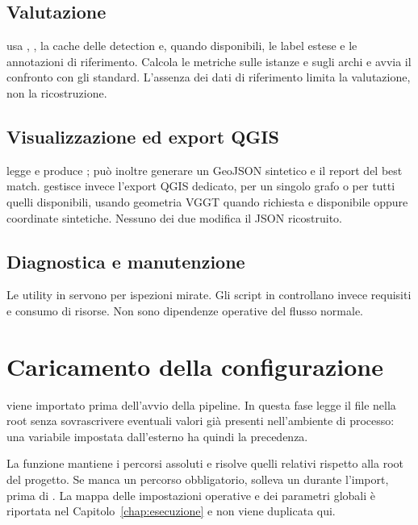 \subsection{Valutazione}

 usa ,
, la cache delle detection e, quando disponibili,
le label estese e le annotazioni di riferimento. Calcola le metriche sulle
istanze e sugli archi e avvia il confronto con gli standard. L'assenza dei dati
di riferimento limita la valutazione, non la ricostruzione.

\subsection{Visualizzazione ed export QGIS}

 legge  e produce
; può inoltre generare un GeoJSON sintetico e il
report del best match.  gestisce invece
l'export QGIS dedicato, per un singolo grafo o per tutti quelli disponibili,
usando geometria VGGT quando richiesta e disponibile oppure coordinate
sintetiche. Nessuno dei due modifica il JSON ricostruito.

\subsection{Diagnostica e manutenzione}

Le utility in  servono per ispezioni mirate. Gli script
in  controllano invece requisiti e consumo di
risorse. Non sono dipendenze operative del flusso normale.

\section{Caricamento della configurazione}

 viene importato prima dell'avvio
della pipeline. In questa fase legge il file  nella root senza
sovrascrivere eventuali valori già presenti nell'ambiente di processo: una
variabile impostata dall'esterno ha quindi la precedenza.

La funzione  mantiene i percorsi assoluti e risolve quelli
relativi rispetto alla root del progetto. Se manca un percorso obbligatorio,
solleva un  durante l'import, prima di . La mappa
delle impostazioni operative e dei parametri globali è riportata nel
Capitolo~\ref{chap:esecuzione} e non viene duplicata qui.
